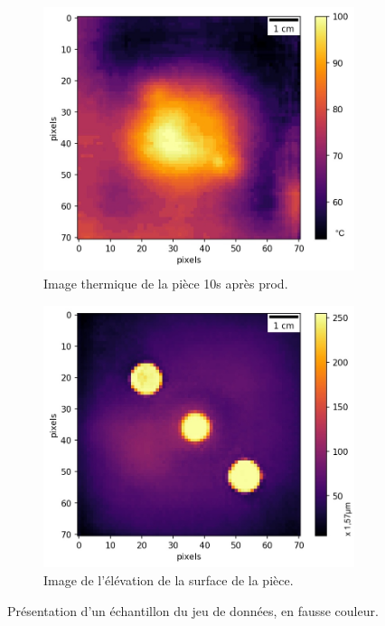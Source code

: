 \begin{figure}[tbhp]
	\centering
	\begin{subfigure}[c]{0.48\textwidth}
		\includegraphics[width=\textwidth]{../Chap2/Figures/163-37_real_A.jpg}
		\caption{Image thermique de la pièce 10s après prod.}
	\end{subfigure}
	\begin{subfigure}[c]{0.48\textwidth}
		\includegraphics[width=\textwidth]{../Chap2/Figures/163-37_real_B.jpg}
		\caption{Image de l'élévation de la surface de la pièce.}
	\end{subfigure}
	\caption{Présentation d'un échantillon du jeu de données, en fausse couleur.}
	\label{fig:gan_dataset}
\end{figure}

